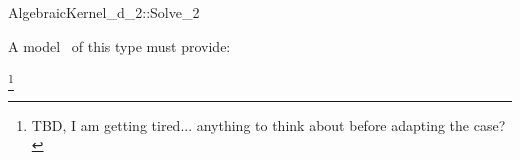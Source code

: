 \begin{ccRefConcept}{AlgebraicKernel_d_2::Solve_2}

\ccDefinition


A model \ccVar\ of this type must provide:

\footnote{TBD, I am getting tired... anything to think about before 
adapting the  case? }

\end{ccRefConcept}
